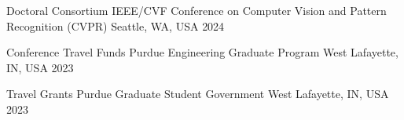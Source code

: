 

\begin{cvhonors}

\cvhonor
{Doctoral Consortium} %
{IEEE/CVF Conference on Computer Vision and Pattern Recognition (CVPR)} %
{Seattle, WA, USA} %
{2024} %

\cvhonor
{Conference Travel Funds} %
{Purdue Engineering Graduate Program} %
{West Lafayette, IN, USA} %
{2023} %

\cvhonor
{Travel Grants} %
{Purdue Graduate Student Government} %
{West Lafayette, IN, USA} %
{2023} %

%
%
%

\end{cvhonors}
